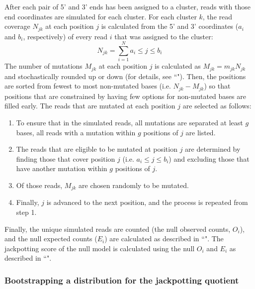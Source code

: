 \documentclass[11pt]{article}
\begin{document}
After each pair of 5' and 3' ends has been assigned to a cluster, reads with those end coordinates are simulated for each cluster.
For each cluster $k$, the read coverage $N_{jk}$ at each position $j$ is calculated from the 5' and 3' coordinates ($a_i$ and $b_i$, respectively) of every read $i$ that was assigned to the cluster:
$$N_{jk} = \sum_{i=1}^N{a_i \le j \le b_i}$$
The number of mutations $M_{jk}$ at each position $j$ is calculated as $M_{jk} = m_{jk} N_{jk}$ and stochastically rounded up or down (for details, see ``").
Then, the positions are sorted from fewest to most non-mutated bases (i.e. $N_{jk} - M_{jk}$) so that positions that are constrained by having few options for non-mutated bases are filled early.
The reads that are mutated at each position $j$ are selected as follows:
\begin{enumerate}
    \item To ensure that in the simulated reads, all mutations are separated at least $g$ bases, all reads with a mutation within $g$ positions of $j$ are listed.
    \item The reads that are eligible to be mutated at position $j$ are determined by finding those that cover position $j$ (i.e. $a_i \le j \le b_i$) and excluding those that have another mutation within $g$ positions of $j$.
    \item Of those reads, $M_{jk}$ are chosen randomly to be mutated.
    \item Finally, $j$ is advanced to the next position, and the process is repeated from step 1.
\end{enumerate}

Finally, the unique simulated reads are counted (the null observed counts, $O_i$), and the null expected counts ($E_i$) are calculated as described in ``".
The jackpotting score of the null model is calculated using the null $O_i$ and $E_i$ as described in ``".

\subsubsection{Bootstrapping a distribution for the jackpotting quotient}
\end{document}
